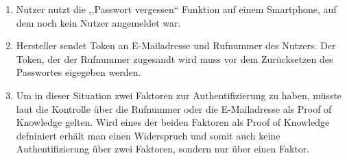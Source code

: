 \begin{itemize}[leftmargin=0cm,label={}]
                \begin{enumerate}[noitemsep]
                    \item Nutzer nutzt die ,,Passwort vergessen`` Funktion auf einem Smartphone, auf dem noch kein Nutzer angemeldet war.
                    \item Hersteller sendet Token an E-Mailadresse und Rufnummer des Nutzers.
                        Der Token, der der Rufnummer zugesandt wird muss vor dem Zurücksetzen des Passwortes eigegeben werden.
                    \item Um in dieser Situation zwei Faktoren zur Authentifizierung zu haben, müsste laut \cite{Jmaxxz2015} die Kontrolle über die Rufnummer oder die E-Mailadresse als Proof of Knowledge gelten.
                        Wird eines der beiden Faktoren als Proof of Knowledge defniniert erhält man einen Widerspruch und somit auch keine Authentifizierung über zwei Faktoren, sondern nur über einen Faktor.
                \end{enumerate}
        \end{itemize}
        
